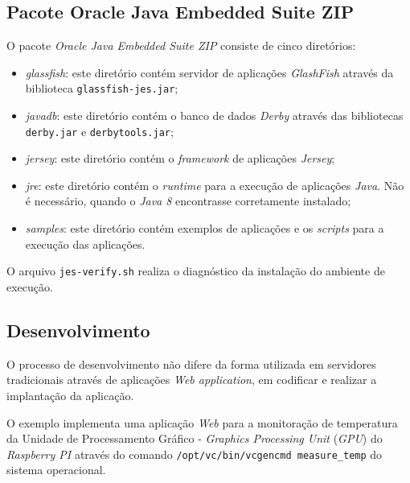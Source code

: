 \subsection{Pacote Oracle Java Embedded Suite ZIP}

O pacote \textit{Oracle Java Embedded Suite ZIP} consiste de cinco diretórios:

\begin{itemize}

    \item \textit{glassfish}: este diretório contém servidor de aplicações
    \textit{GlashFish} através da biblioteca \verb|glassfish-jes.jar|;

    \item \textit{javadb}: este diretório contém o banco de dados
    \textit{Derby} através das bibliotecas \verb|derby.jar| e
    \verb|derbytools.jar|;

    \item \textit{jersey}: este diretório contém o \textit{framework} de
    aplicações \textit{Jersey};

    \item \textit{jre}: este diretório contém o \textit{runtime} para a
    execução de aplicações \textit{Java}. Não é necessário, quando o
    \textit{Java 8} encontrasse corretamente instalado;

    \item \textit{samples}: este diretório contém exemplos de aplicações e os
    \textit{scripts} para a execução das aplicações.

\end{itemize}

O arquivo \verb|jes-verify.sh| realiza o diagnóstico da instalação do ambiente
de execução.

\subsection{Desenvolvimento}

O processo de desenvolvimento não difere da forma utilizada em servidores
tradicionais através de aplicações \textit{Web application}, em codificar e
realizar a implantação da aplicação.

O exemplo implementa uma aplicação \textit{Web} para a monitoração de
temperatura da Unidade de Processamento Gráfico - \textit{Graphics Processing
    Unit} (\textit{GPU}) do \textit{Raspberry PI} através do comando
\verb|/opt/vc/bin/vcgencmd measure_temp| do sistema operacional.

